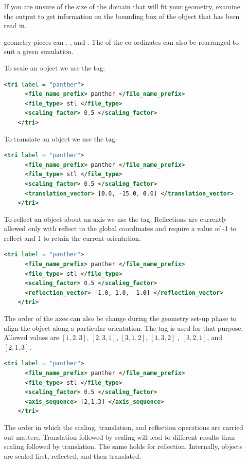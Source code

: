 \begin{minipage}{0.6\textwidth}
  \begin{NoteBox}
  If you are unsure of the size of the domain that will fit your geometry,
  examine the output to get information on the bounding box of the object that
  has been read in.
  \end{NoteBox}
   geometry pieces can , , and 
  .  The  of the co-ordinates can also be
  rearranged to suit a given simulation.

  To scale an object we use the  tag:
  \begin{lstlisting}[language=XML]
    <tri label = "panther">
      <file_name_prefix> panther </file_name_prefix>
      <file_type> stl </file_type>
      <scaling_factor> 0.5 </scaling_factor>
    </tri>
  \end{lstlisting}

  To translate an object we use the  tag:
  \begin{lstlisting}[language=XML]
    <tri label = "panther">
      <file_name_prefix> panther </file_name_prefix>
      <file_type> stl </file_type>
      <scaling_factor> 0.5 </scaling_factor>
      <translation_vector> [0.0, -15.0, 0.0] </translation_vector>
    </tri>
  \end{lstlisting}

  To reflect an object about an axis we use the  tag.
  Reflections are currently allowed only with reflect to the global coordinates
  and require a value of -1 to reflect and 1 to retain the current orientation.
  \begin{lstlisting}[language=XML]
    <tri label = "panther">
      <file_name_prefix> panther </file_name_prefix>
      <file_type> stl </file_type>
      <scaling_factor> 0.5 </scaling_factor>
      <reflection_vector> [1.0, 1.0, -1.0] </reflection_vector>
    </tri>
  \end{lstlisting}

  The order of the axes can also be change during the geometry set-up phase
  to align the object along a particular orientation.  The 
  tag is used for that purpose.  Allowed values are $[1,2,3]$, $[2,3,1]$, $[3,1,2]$,
  $[1,3,2]$ , $[3,2,1]$, and $[2,1,3]$.
  \begin{lstlisting}[language=XML]
    <tri label = "panther">
      <file_name_prefix> panther </file_name_prefix>
      <file_type> stl </file_type>
      <scaling_factor> 0.5 </scaling_factor>
      <axis_sequence> [2,1,3] </axis_sequence>
    </tri>
  \end{lstlisting}

  \begin{WarningBox}
  The order in which the scaling, translation, and reflection operations are carried
  out matters.  Translation followed by scaling will lead to different results than 
  scaling followed by translation.  The same holds for reflection.  Internally, objects
  are scaled first, reflected, and then translated.
  \end{WarningBox}
\end{minipage}
